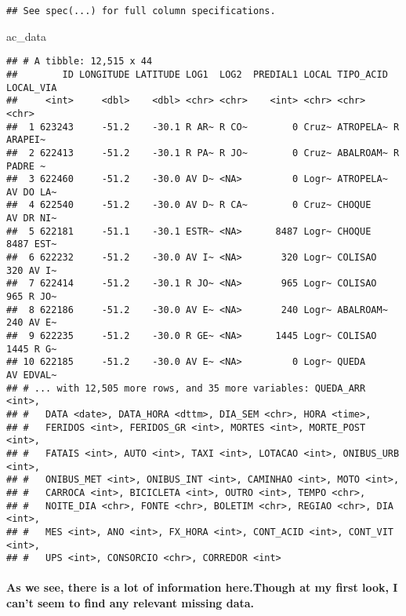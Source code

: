 \documentclass[]{article}
\newenvironment{Shaded}{\begin{snugshade}}{\end{snugshade}}
\newcommand{\NormalTok}[1]{#1}
\let\oldparagraph\paragraph
\renewcommand{\paragraph}[1]{\oldparagraph{#1}\mbox{}}
\begin{document}
\begin{verbatim}
## See spec(...) for full column specifications.
\end{verbatim}

\begin{Shaded}
\begin{Highlighting}[]
\NormalTok{ac_data}
\end{Highlighting}
\end{Shaded}

\begin{verbatim}
## # A tibble: 12,515 x 44
##        ID LONGITUDE LATITUDE LOG1  LOG2  PREDIAL1 LOCAL TIPO_ACID LOCAL_VIA
##     <int>     <dbl>    <dbl> <chr> <chr>    <int> <chr> <chr>     <chr>    
##  1 623243     -51.2    -30.1 R AR~ R CO~        0 Cruz~ ATROPELA~ R ARAPEI~
##  2 622413     -51.2    -30.1 R PA~ R JO~        0 Cruz~ ABALROAM~ R PADRE ~
##  3 622460     -51.2    -30.0 AV D~ <NA>         0 Logr~ ATROPELA~ AV DO LA~
##  4 622540     -51.2    -30.0 AV D~ R CA~        0 Cruz~ CHOQUE    AV DR NI~
##  5 622181     -51.1    -30.1 ESTR~ <NA>      8487 Logr~ CHOQUE    8487 EST~
##  6 622232     -51.2    -30.0 AV I~ <NA>       320 Logr~ COLISAO   320 AV I~
##  7 622414     -51.2    -30.1 R JO~ <NA>       965 Logr~ COLISAO   965 R JO~
##  8 622186     -51.2    -30.0 AV E~ <NA>       240 Logr~ ABALROAM~ 240 AV E~
##  9 622235     -51.2    -30.0 R GE~ <NA>      1445 Logr~ COLISAO   1445 R G~
## 10 622185     -51.2    -30.0 AV E~ <NA>         0 Logr~ QUEDA     AV EDVAL~
## # ... with 12,505 more rows, and 35 more variables: QUEDA_ARR <int>,
## #   DATA <date>, DATA_HORA <dttm>, DIA_SEM <chr>, HORA <time>,
## #   FERIDOS <int>, FERIDOS_GR <int>, MORTES <int>, MORTE_POST <int>,
## #   FATAIS <int>, AUTO <int>, TAXI <int>, LOTACAO <int>, ONIBUS_URB <int>,
## #   ONIBUS_MET <int>, ONIBUS_INT <int>, CAMINHAO <int>, MOTO <int>,
## #   CARROCA <int>, BICICLETA <int>, OUTRO <int>, TEMPO <chr>,
## #   NOITE_DIA <chr>, FONTE <chr>, BOLETIM <chr>, REGIAO <chr>, DIA <int>,
## #   MES <int>, ANO <int>, FX_HORA <int>, CONT_ACID <int>, CONT_VIT <int>,
## #   UPS <int>, CONSORCIO <chr>, CORREDOR <int>
\end{verbatim}

\paragraph{As we see, there is a lot of information here.Though at my
first look, I can't seem to find any relevant missing
data.}\label{as-we-see-there-is-a-lot-of-information-here.though-at-my-first-look-i-cant-seem-to-find-any-relevant-missing-data.}
\end{document}

